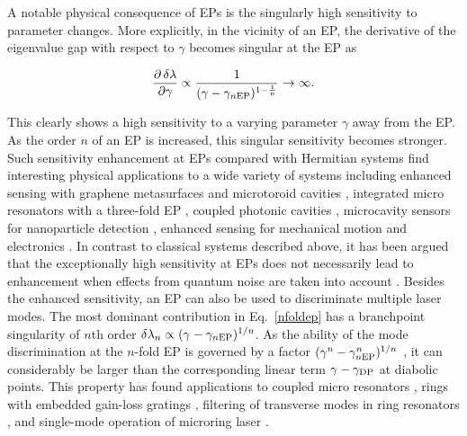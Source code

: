 \documentclass{tADP2e}
\theoremstyle{plain}
\newcommand{\eqn}[1]{
\begin{eqnarray}
	#1
\end{eqnarray}
}
\theoremstyle{plain}
\theoremstyle{definition}
\begin{document}
{A notable physical consequence of EPs is the singularly high sensitivity to parameter changes.   
More explicitly, in the vicinity of an EP, the derivative of the eigenvalue gap with respect to $\gamma$ becomes singular at the EP as
\eqn{
 \frac{\partial\,\delta\lambda}{\partial\gamma}\propto \frac{1}{(\gamma-\gamma_{n{\rm EP}})^{1-\frac{1}{n}}}\to\infty.
}
This clearly shows a high sensitivity to a varying parameter $\gamma$ away from the EP.
As the order $n$ of an EP is increased, this singular sensitivity becomes stronger. 
Such sensitivity enhancement at EPs compared with Hermitian systems find interesting physical applications to a wide variety of systems including 
enhanced sensing with graphene metasurfaces \cite{CPY16} and microtoroid cavities \cite{CW17}, integrated micro resonators with a three-fold EP \cite{HH17}, 
coupled photonic cavities \cite{ZS16}, 
microcavity sensors for nanoparticle detection \cite{WJ142},  
enhanced sensing for mechanical motion \cite{LZP16}  and electronics \cite{CPY18}.
In contrast to classical systems described above, it has been argued that the exceptionally high sensitivity at EPs does not necessarily lead to enhancement  when effects from quantum noise are taken into account \cite{LW18,ZM19,LHK18}. 
Besides the enhanced sensitivity, an EP can also be used to discriminate multiple laser modes. The most dominant contribution in Eq.~\eqref{nfoldep} has a branchpoint singularity of $n$th order $\delta\lambda_{n}\propto(\gamma-\gamma_{n{\rm EP}})^{1/n}$. As the ability of the mode discrimination at the $n$-fold EP is governed by a factor $(\gamma^n-\gamma_{n{\rm EP}}^n)^{1/n}$ \cite{HH14},  it can considerably be larger than the corresponding linear term $\gamma-\gamma_{\rm DP}$ at diabolic points. This property has found applications to coupled micro resonators \cite{HH14}, rings with embedded gain-loss gratings \cite{LF14},  filtering of  transverse modes in ring resonators \cite{HH162}, and single-mode operation of microring laser \cite{LW17}.
}
\end{document}
